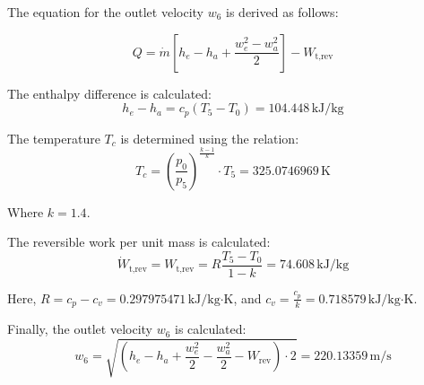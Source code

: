 The equation for the outlet velocity \(w_6\) is derived as follows:  

\[
Q = \dot{m} \left[ h_e - h_a + \frac{w_e^2 - w_a^2}{2} \right] - W_{\text{t,rev}}
\]

The enthalpy difference is calculated:  
\[
h_e - h_a = c_p (T_5 - T_0) = 104.448 \, \text{kJ/kg}
\]

The temperature \(T_c\) is determined using the relation:  
\[
T_c = \left( \frac{p_0}{p_5} \right)^{\frac{k-1}{k}} \cdot T_5 = 325.0746969 \, \text{K}
\]

Where \(k = 1.4\).  

The reversible work per unit mass is calculated:  
\[
\dot{W}_{\text{t,rev}} = W_{\text{t,rev}} = R \frac{T_5 - T_0}{1 - k} = 74.608 \, \text{kJ/kg}
\]

Here, \(R = c_p - c_v = 0.297975471 \, \text{kJ/kg·K}\), and \(c_v = \frac{c_p}{k} = 0.718579 \, \text{kJ/kg·K}\).  

Finally, the outlet velocity \(w_6\) is calculated:  
\[
w_6 = \sqrt{ \left( h_e - h_a + \frac{w_e^2}{2} - \frac{w_a^2}{2} - W_{\text{rev}} \right) \cdot 2 } = 220.13359 \, \text{m/s}
\]